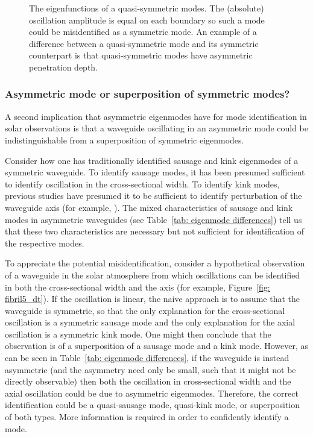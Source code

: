 \documentclass[12pt,draft]{../style-files/ociamthesis}
\begin{document}
\begin{figure}
{{
		\label{fig: quasi-sym kink}
		}
	}
	\caption{The eigenfunctions of a quasi-symmetric modes. The (absolute) oscillation amplitude is equal on each boundary so such a mode could be misidentified as a symmetric mode. An example of a difference between a quasi-symmetric mode and its symmetric counterpart is that quasi-symmetric modes have asymmetric penetration depth.}
	\label{fig: quasi-sym}
\end{figure}


\subsubsection{Asymmetric mode or superposition of symmetric modes?}

A second implication that asymmetric eigenmodes have for mode identification in solar observations is that a waveguide oscillating in an asymmetric mode could be indistinguishable from a superposition of symmetric eigenmodes.

Consider how one has traditionally identified sausage and kink eigenmodes of a symmetric waveguide. To identify sausage modes, it has been presumed sufficient to identify oscillation in the cross-sectional width. To identify kink modes, previous studies have presumed it to be sufficient to identify perturbation of the waveguide axis (for example, \citealp{mor_etal12}). The mixed characteristics of sausage and kink modes in asymmetric waveguides (see Table~\ref{tab: eigenmode differences}) tell us that these two characteristics are necessary but not sufficient for identification of the respective modes.

To appreciate the potential misidentification, consider a hypothetical observation of a waveguide in the solar atmosphere from which oscillations can be identified in both the cross-sectional width and the axis (for example, Figure~\ref{fig: fibril5_dt}). If the oscillation is linear, the naive approach is to assume that the waveguide is symmetric, so that the only explanation for the cross-sectional oscillation is a symmetric sausage mode and the only explanation for the axial oscillation is a symmetric kink mode. One might then conclude that the observation is of a superposition of a sausage mode and a kink mode. However, as can be seen in Table~\ref{tab: eigenmode differences}, if the waveguide is instead asymmetric (and the asymmetry need only be small, such that it might not be directly observable) then both the oscillation in cross-sectional width and the axial oscillation could be due to asymmetric eigenmodes. Therefore, the correct identification could be a quasi-sausage mode, quasi-kink mode, or superposition of both types. More information is required in order to confidently identify a mode.
\end{document}

